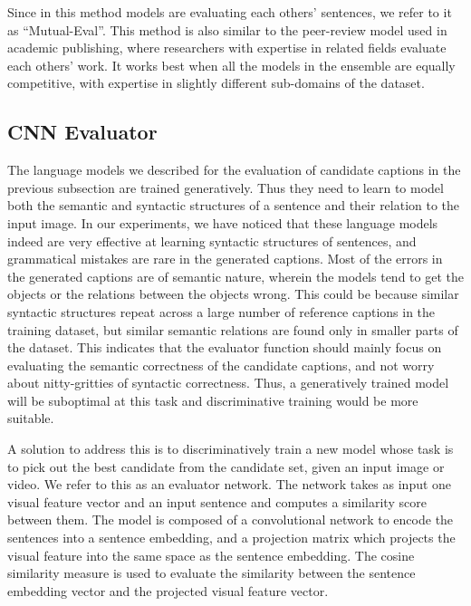 Since in this method models are evaluating each others' sentences, we refer to it
as ``Mutual-Eval''. 
This method is also similar to the peer-review model used in academic
publishing, where researchers with expertise in related fields evaluate each
others' work.
It works best when all the models in the ensemble are equally competitive, with
expertise in slightly different sub-domains of the dataset.

\subsection{CNN Evaluator}
The language models we described for the evaluation of candidate captions in the
previous subsection are trained generatively.
Thus they need to learn to model both the semantic and syntactic structures of a
sentence and their relation to the input image.
In our experiments, we have noticed that these language models indeed are very
effective at learning syntactic structures of sentences, and grammatical
mistakes are rare in the generated captions.
Most of the errors in the generated captions are of semantic nature, wherein the
models tend to get the objects or the relations between the objects wrong.
This could be because similar syntactic structures repeat across a large number of
reference captions in the training dataset, but similar semantic relations
are found only in smaller parts of the dataset.
This indicates that the evaluator function should mainly focus on
evaluating the semantic correctness of the candidate captions, and not worry
about nitty-gritties of syntactic correctness. 
Thus, a generatively trained model will be suboptimal at this task and
discriminative training would be more suitable. 

A solution to address this is to discriminatively train a new model whose task is to
pick out the best candidate from the candidate set, given an input image or
video.
We refer to this as an evaluator network.
The network takes as input one visual feature vector and an input sentence and
computes a similarity score between them. 
The model is composed of a convolutional network to encode the sentences into a
sentence embedding, and a projection matrix which projects the visual feature
into the same space as the sentence embedding.
The cosine similarity measure is used to evaluate the similarity between the
sentence embedding vector and the projected visual feature vector. 


